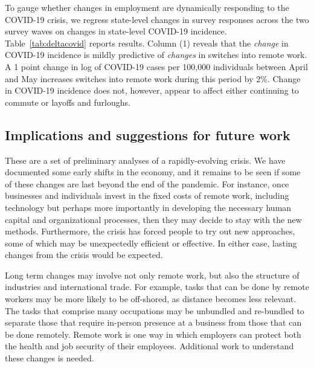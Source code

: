\documentclass[12pt]{article}
\begin{document}
To gauge whether changes in employment are dynamically responding to the COVID-19 crisis, we regress state-level changes in survey responses across the two survey waves on changes in state-level COVID-19 incidence. Table~\ref{tab:deltacovid} reports results. Column (1) reveals that the \textit{change} in COVID-19 incidence is mildly predictive of \textit{changes} in switches into remote work. A 1 point change in log of COVID-19 cases per 100,000 individuals between April and May increases switches into remote work during this period by 2\%. Change in COVID-19 incidence does not, however, appear to affect either continuing to commute or layoffs and furloughs.



\subsection{Implications and suggestions for future work}
These are a set of preliminary analyses of a rapidly-evolving crisis. We have documented some early shifts in the economy, and it remains to be seen if some of these changes are last beyond the end of the pandemic. For instance, once businesses and individuals invest in the fixed costs of remote work, including technology but perhaps more importantly in developing the necessary human capital and organizational processes, then they may decide to stay with the new methods.  
Furthermore, the crisis has forced people to try out new approaches, some of which may be unexpectedly efficient or effective.  In either case, lasting changes from the crisis would be expected.  

Long term changes may involve not only remote work, but also the structure of industries and international trade. For example, tasks that can be done by remote workers may be more likely to be off-shored, as distance becomes less relevant. The tasks that comprise many occupations may be unbundled and re-bundled to separate those that require in-person presence at a business from those that can be done remotely. Remote work is one way in which employers can protect both the health and job security of their employees. Additional work to understand these changes is needed. 

\end{document}
